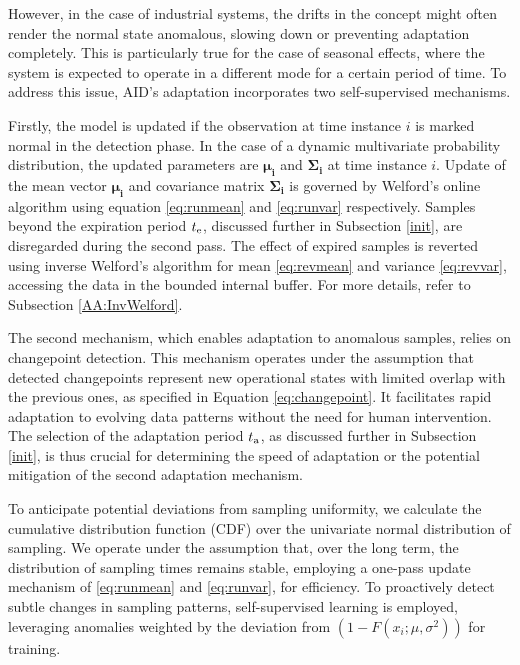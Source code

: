 However, in the case of industrial systems, the drifts in the concept might often render the normal state anomalous, slowing down or preventing adaptation completely. This is particularly true for the case of seasonal effects, where the system is expected to operate in a different mode for a certain period of time. To address this issue, AID's adaptation incorporates two self-supervised mechanisms.

Firstly, the model is updated if the observation at time instance \(i\) is marked normal in the detection phase. In the case of a dynamic multivariate probability distribution, the updated parameters are $\boldsymbol{\mu_i}$ and $\boldsymbol{\Sigma_i}$ at time instance \(i\). Update of the mean vector $\boldsymbol{\mu_i}$ and covariance matrix $\boldsymbol{\Sigma_i}$ is governed by Welford's online algorithm using equation \eqref{eq:runmean} and \eqref{eq:runvar} respectively. Samples beyond the expiration period $t _{\text{e}}$, discussed further in Subsection \ref{init}, are disregarded during the second pass. The effect of expired samples is reverted using inverse Welford's algorithm for mean \eqref{eq:revmean} and variance \eqref{eq:revvar}, accessing the data in the bounded internal buffer. For more details, refer to Subsection \ref{AA:InvWelford}.

The second mechanism, which enables adaptation to anomalous samples, relies on changepoint detection. This mechanism operates under the assumption that detected changepoints represent new operational states with limited overlap with the previous ones, as specified in Equation \ref{eq:changepoint}. It facilitates rapid adaptation to evolving data patterns without the need for human intervention. The selection of the adaptation period $t _{\text{a}}$, as discussed further in Subsection \ref{init}, is thus crucial for determining the speed of adaptation or the potential mitigation of the second adaptation mechanism.

To anticipate potential deviations from sampling uniformity, we calculate the cumulative distribution function (CDF) over the univariate normal distribution of sampling. We operate under the assumption that, over the long term, the distribution of sampling times remains stable, employing a one-pass update mechanism of \eqref{eq:runmean} and \eqref{eq:runvar}, for efficiency. To proactively detect subtle changes in sampling patterns, self-supervised learning is employed, leveraging anomalies weighted by the deviation from $(1 - F(x_i; \mu, \sigma^2))$ for training.

